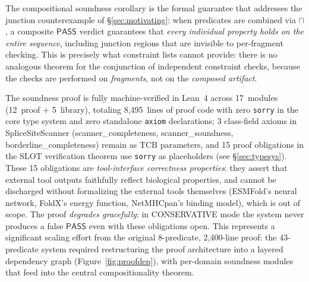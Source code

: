 \documentclass[acmsmall,review,anonymous]{acmart}
\newcommand{\PASS}{\ensuremath{\mathsf{PASS}}\xspace}
\begin{document}
\noindent The compositional soundness corollary is the formal
guarantee that addresses the junction counterexample of
\S\ref{sec:motivating}: when predicates are combined via $\sqcap$,
a composite \PASS{} verdict guarantees that \emph{every individual
property holds on the entire sequence}, including junction regions
that are invisible to per-fragment checking.
This is precisely what constraint lists cannot provide: there is no
analogous theorem for the conjunction of independent constraint checks,
because the checks are performed on \emph{fragments}, not on the
\emph{composed artifact}.

The soundness proof is fully machine-verified in Lean~4 across
17~modules (12~proof $+$ 5~library), totaling 8,495~lines of proof
code with zero \texttt{sorry} in the core type system and zero standalone
\texttt{axiom} declarations; 3 class-field axioms in SpliceSiteScanner
(scanner\_completeness, scanner\_soundness, borderline\_completeness)
remain as TCB parameters, and 15 proof obligations in the SLOT verification
theorem use \texttt{sorry} as placeholders (see \S\ref{sec:typesys}).
These 15 obligations are \emph{tool-interface correctness properties}:
they assert that external tool outputs faithfully reflect biological
properties, and cannot be discharged without formalizing the external
tools themselves (ESMFold's neural network, FoldX's energy function,
NetMHCpan's binding model), which is out of scope. The proof
\emph{degrades gracefully}: in CONSERVATIVE mode the system never
produces a false \PASS{} even with these obligations open.
This represents a significant scaling effort from the original 8-predicate,
2,400-line proof: the 43-predicate system required restructuring the
proof architecture into a layered dependency graph
(Figure~\ref{fig:proofdep}), with per-domain soundness modules that
feed into the central compositionality theorem.
\end{document}
